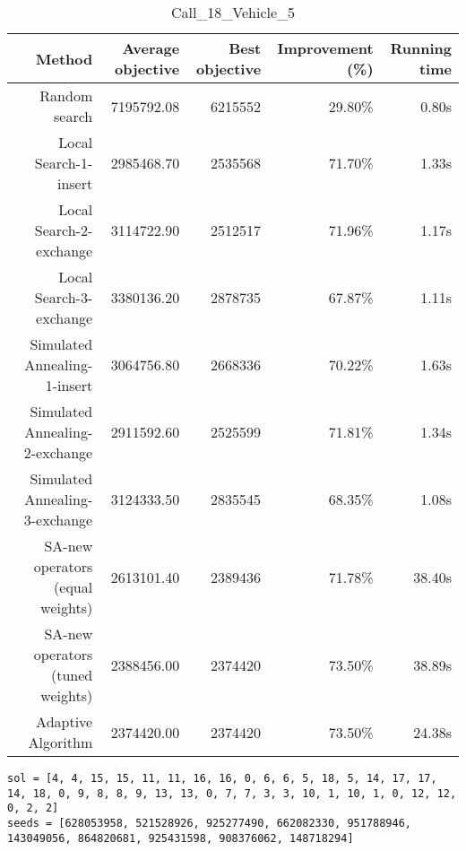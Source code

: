 \begin{table}[ht]
\centering
\caption{Call\_18\_Vehicle\_5}
\label{tab:call18vehicle5}
\begin{tabular}{|r|r|r|r|r|}
Method & Average objective & Best objective & Improvement (\%) & Running time \\
\hline
Random search & 7195792.08 & 6215552 & 29.80\% & 0.80s\\
Local Search-1-insert & 2985468.70 & 2535568 & 71.70\% & 1.33s\\
Local Search-2-exchange & 3114722.90 & 2512517 & 71.96\% & 1.17s\\
Local Search-3-exchange & 3380136.20 & 2878735 & 67.87\% & 1.11s\\
Simulated Annealing-1-insert & 3064756.80 & 2668336 & 70.22\% & 1.63s\\
Simulated Annealing-2-exchange & 2911592.60 & 2525599 & 71.81\% & 1.34s\\
Simulated Annealing-3-exchange & 3124333.50 & 2835545 & 68.35\% & 1.08s\\
SA-new operators (equal weights) & 2613101.40 & 2389436 & 71.78\% & 38.40s\\
SA-new operators (tuned weights) & 2388456.00 & 2374420 & 73.50\% & 38.89s\\
Adaptive Algorithm & 2374420.00 & 2374420 & 73.50\% & 24.38s\\
\end{tabular}%
\end{table}
\begin{lstlisting}[label={lst:call18vehicle5},caption=Optimal solution call\_18\_vehicle\_5]
sol = [4, 4, 15, 15, 11, 11, 16, 16, 0, 6, 6, 5, 18, 5, 14, 17, 17, 14, 18, 0, 9, 8, 8, 9, 13, 13, 0, 7, 7, 3, 3, 10, 1, 10, 1, 0, 12, 12, 0, 2, 2]
seeds = [628053958, 521528926, 925277490, 662082330, 951788946, 143049056, 864820681, 925431598, 908376062, 148718294]
\end{lstlisting}%
\clearpage


